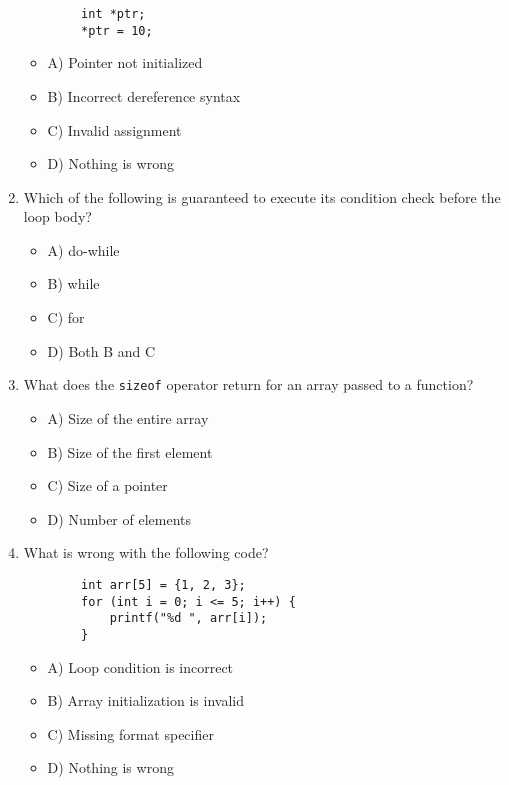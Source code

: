 \documentclass[a4paper,12pt]{article}
\begin{document}
\begin{enumerate}
    \lstset{language=C}
    \begin{lstlisting}
        int *ptr;
        *ptr = 10;
    \end{lstlisting}    
    
    \begin{itemize}
        \item A) Pointer not initialized
        \item B) Incorrect dereference syntax
        \item C) Invalid assignment
        \item D) Nothing is wrong
    \end{itemize}

    \item Which of the following is guaranteed to execute its condition check before the loop body?
    \begin{itemize}
        \item A) do-while
        \item B) while
        \item C) for
        \item D) Both B and C
    \end{itemize}

    \item What does the \verb|sizeof| operator return for an array passed to a function?
    \begin{itemize}
        \item A) Size of the entire array
        \item B) Size of the first element
        \item C) Size of a pointer
        \item D) Number of elements
    \end{itemize}

    \item What is wrong with the following code?

    \lstset{language=C}
    \begin{lstlisting}
        int arr[5] = {1, 2, 3};
        for (int i = 0; i <= 5; i++) {
            printf("%d ", arr[i]);
        }
    \end{lstlisting}

    \begin{itemize}
        \item A) Loop condition is incorrect
        \item B) Array initialization is invalid
        \item C) Missing format specifier
        \item D) Nothing is wrong
    \end{itemize}


\end{enumerate}
\end{document}
